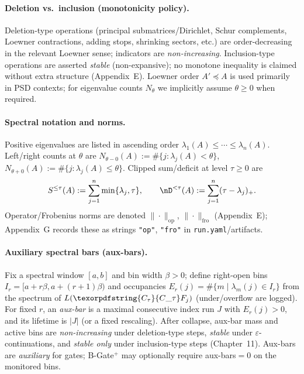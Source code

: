\documentclass[11pt]{article}
\DeclareRobustCommand{\hyp}{\nobreakdash-}
\numberwithin{equation}{section}
\theoremstyle{definition}
\DeclareRobustCommand{\Ctau}{\texorpdfstring{\ensuremath{C_{\tau}}}{C\_\tau}}
\begin{document}
\paragraph{Deletion vs.\ inclusion (monotonicity policy).}
Deletion\hyp type operations (principal submatrices/Dirichlet, Schur complements, Loewner contractions, adding stops, shrinking sectors, etc.) are order\hyp decreasing in the relevant Loewner sense; indicators are \emph{non\hyp increasing}.
Inclusion\hyp type operations are asserted \emph{stable} (non\hyp expansive); no monotone inequality is claimed without extra structure (Appendix~E).
Loewner order \(A'\preceq A\) is used primarily in PSD contexts; for eigenvalue counts \(N_\theta\) we implicitly assume \(\theta\ge0\) when required.

\paragraph{Spectral notation and norms.}
Positive eigenvalues are listed in ascending order \(\lambda_1(A)\le\cdots\le\lambda_n(A)\).
Left/right counts at \(\theta\) are \(N_{\theta-0}(A):=\#\{j:\lambda_j(A)<\theta\}\), \(N_{\theta+0}(A):=\#\{j:\lambda_j(A)\le\theta\}\).
Clipped sum/deficit at level \(\tau\ge0\) are
\[
S^{\le\tau}(A):=\sum_{j=1}^n \min\{\lambda_j,\tau\},\qquad\nD^{<\tau}(A):=\sum_{j=1}^n (\tau-\lambda_j)_+.
\]
Operator/Frobenius norms are denoted \(\|\cdot\|_{\mathrm{op}}\), \(\|\cdot\|_{\mathrm{fro}}\) (Appendix~E); Appendix~G records these as strings \texttt{"op"}, \texttt{"fro"} in \texttt{run.yaml}/artifacts.

\paragraph{Auxiliary spectral bars (aux-bars).}
Fix a spectral window \([a,b]\) and bin width \(\beta>0\); define right\hyp open bins \(I_r=[a+r\beta,a+(r+1)\beta)\) and occupancies
\(E_r(j)=\#\{m\mid \lambda_m(j)\in I_r\}\) from the spectrum of \(L(\Ctau F_j)\) (under/overflow are logged).
For fixed \(r\), an \emph{aux-bar} is a maximal consecutive index run \(J\) with \(E_r(j)>0\), and its lifetime is \(|J|\) (or a fixed rescaling).
After collapse, aux\hyp bar mass and active bins are \emph{non\hyp increasing} under deletion\hyp type steps, \emph{stable} under \(\varepsilon\)\hyp continuations, and \emph{stable only} under inclusion\hyp type steps (Chapter~11).
Aux\hyp bars are \emph{auxiliary} for gates; B\hyp Gate\(^{+}\) may optionally require aux\hyp bars\(=0\) on the monitored bins.
\end{document}
